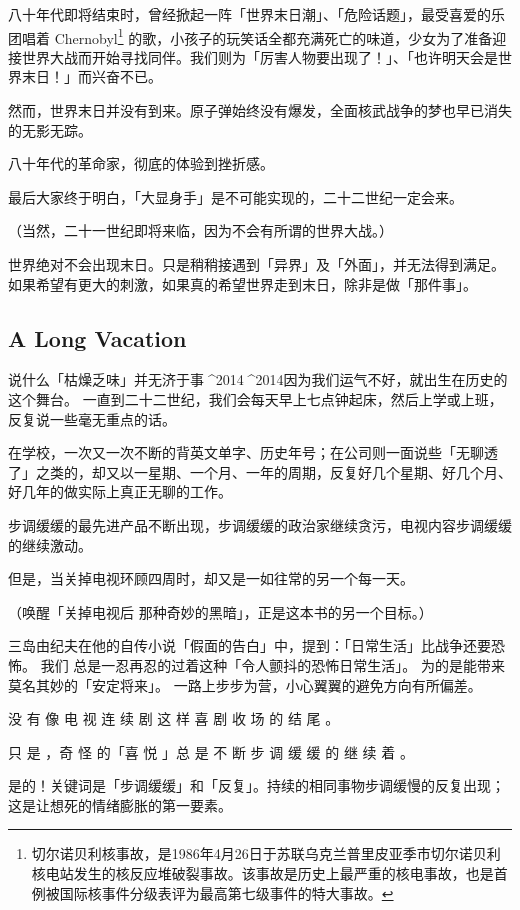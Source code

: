 \documentclass[UTF8]{ctexart}
\begin{document}
八十年代即将结束时，曾经掀起一阵「世界末日潮」、「危险话题」，最受喜爱的乐团唱着 Chernobyl\footnote{切尔诺贝利核事故，是1986年4月26日于苏联乌克兰普里皮亚季市切尔诺贝利核电站发生的核反应堆破裂事故。该事故是历史上最严重的核电事故，也是首例被国际核事件分级表评为最高第七级事件的特大事故。} 的歌，小孩子的玩笑话全都充满死亡的味道，少女为了准备迎接世界大战而开始寻找同伴。我们则为「厉害人物要出现了！」、「也许明天会是世界末日！」而兴奋不已。

然而，世界末日并没有到来。原子弹始终没有爆发，全面核武战争的梦也早已消失的无影无踪。

八十年代的革命家，彻底的体验到挫折感。

最后大家终于明白，「大显身手」是不可能实现的，二十二世纪一定会来。

（当然，二十一世纪即将来临，因为不会有所谓的世界大战。）

世界绝对不会出现末日。只是稍稍接遇到「异界」及「外面」，并无法得到满足。如果希望有更大的刺激，如果真的希望世界走到末日，除非是做「那件事」。

\subsection{A Long Vacation}

说什么「枯燥乏味」并无济于事^^^^2014^^^^2014因为我们运气不好，就出生在历史的这个舞台。
一直到二十二世纪，我们会每天早上七点钟起床，然后上学或上班，反复说一些毫无重点的话。

在学校，一次又一次不断的背英文单字、历史年号；在公司则一面说些「无聊透了」之类的，却又以一星期、一个月、一年的周期，反复好几个星期、好几个月、好几年的做实际上真正无聊的工作。

步调缓缓的最先进产品不断出现，步调缓缓的政治家继续贪污，电视内容步调缓缓的继续激动。

但是，当关掉电视环顾四周时，却又是一如往常的另一个每一天。

（唤醒「关掉电视后 那种奇妙的黑暗」，正是这本书的另一个目标。）

三岛由纪夫在他的自传小说「假面的告白」中，提到：「日常生活」比战争还要恐怖。
我们 总是一忍再忍的过着这种「令人颤抖的恐怖日常生活」。
为的是能带来莫名其妙的「安定将来」。
一路上步步为营，小心翼翼的避免方向有所偏差。

没 有 像 电 视 连 续 剧 这 样 喜 剧 收 场 的 结 尾 。

只 是 ，奇 怪 的「喜 悦 」总 是 不 断 步 调 缓 缓 的 继 续 着 。

是的！关键词是「步调缓缓」和「反复」。持续的相同事物步调缓慢的反复出现；这是让想死的情绪膨胀的第一要素。
\end{document}
